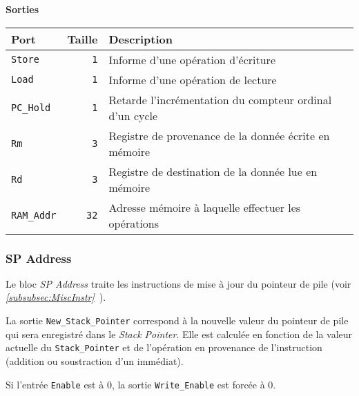 \documentclass{article}
\begin{document}
    \vspace{1em}
    \textbf{Sorties}\\

    \begin{tabular}{|l|r|l|}
        \hline
        \textbf{Port}       & \textbf{Taille} & \textbf{Description}                                    \\
        \hline

        \texttt{Store}    & \texttt{1}      & Informe d'une opération d'écriture                      \\
        \hline
        \texttt{Load}     & \texttt{1}      & Informe d'une opération de lecture                      \\
        \hline
        \texttt{PC\_Hold}  & \texttt{1}      & Retarde l'incrémentation du compteur ordinal d'un cycle \\
        \hline
        \texttt{Rm}       & \texttt{3}      & Registre de provenance de la donnée écrite en mémoire   \\
        \hline
        \texttt{Rd}       & \texttt{3}      & Registre de destination de la donnée lue en mémoire     \\
        \hline
        \texttt{RAM\_Addr} & \texttt{32}     & Adresse mémoire à laquelle effectuer les opérations     \\

        \hline
    \end{tabular}

    \subsubsection{SP Address}
    \label{sec:SPAddr}

    Le bloc \textit{SP Address} traite les instructions de mise à jour du pointeur de pile (voir \textit{\ref{subsubsec:MiscInstr}~}).

    La sortie \texttt{New\_Stack\_Pointer} correspond à la nouvelle valeur du pointeur de pile qui sera enregistré dans le \textit{Stack Pointer}.
    Elle est calculée en fonction de la valeur actuelle du \texttt{Stack\_Pointer} et de l'opération en provenance de l'instruction (addition ou soustraction d'un immédiat).

    Si l'entrée \texttt{Enable} est à 0, la sortie \texttt{Write\_Enable} est forcée à 0.

\end{document}
